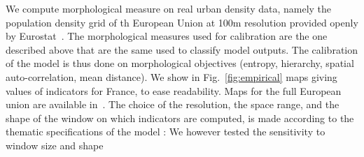 \documentclass[10pt,letterpaper,draft]{article}
\begin{document}


We compute morphological measure on real urban density data, namely the population density grid of th European Union at 100m resolution provided openly by Eurostat~\cite{eurostat}. The morphological measures used for calibration are the one described above that are the same used to classify model outputs. The calibration of the model is thus done on morphological objectives (entropy, hierarchy, spatial auto-correlation, mean distance). We show in Fig.~\ref{fig:empirical} maps giving values of indicators for France, to ease readability. Maps for the full European union are available in~. The choice of the resolution, the space range, and the shape of the window on which indicators are computed, is made according to the thematic specifications of the model : 
We however tested the sensitivity to window size and shape
\end{document}
